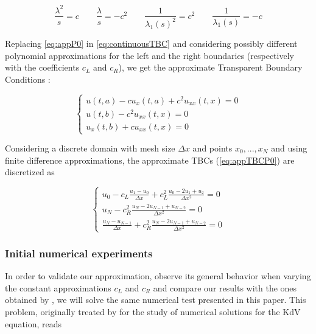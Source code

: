 \begin{equation}
	\label{eq:appP0}
	\frac{\lambda^2}{s}  = c \qquad
	\frac{\lambda}{s}  = -c^2 \qquad
	\frac{1}{\lambda_1(s)^2}  = c^2\qquad 
	 \frac{1}{\lambda_1(s)}  = -c 
\end{equation}

\indent Replacing \eqref{eq:appP0} in \eqref{eq:continuousTBC} and considering possibly different polynomial approximations for the left and the right boundaries (respectively with the coefficients $c_L$ and $c_R$), we get the approximate Transparent Boundary Conditions : 

\begin{equation}
\label{eq:appTBCP0}
    \begin{cases}
        u(t,a) - c u_x(t,a)  + c^2  u_{xx}(t,x) = 0 \\
        u(t,b) - c^2    u_{xx}(t,x) = 0 \\
        u_x(t,b) + c u_{xx}(t,x)= 0 
    \end{cases}
\end{equation}

\indent Considering a discrete domain with mesh size $\Delta x$ and points $x_0, ..., x_N$ and using finite difference approximations, the approximate TBCs (\ref{eq:appTBCP0}) are discretized as

\begin{equation}
\label{eq:appDiscTBCP0}
    \begin{cases}
        u_0 - c_L \frac{u_1 - u_0}{\Delta x}  + c_L^2  \frac{u_0 -2u_1 + u_2}{\Delta x^2} = 0 \\
        u_N - c_R^2    \frac{u_N -2u_{N-1} + u_{N-2}}{\Delta x^2} = 0 \\
        \frac{u_N - u_{N-1}}{\Delta x}  + c_R^2    \frac{u_N -2u_{N-1} + u_{N-2}}{\Delta x^2} = 0 
    \end{cases}
\end{equation}

\subsubsection{Initial numerical experiments}

\indent In order to validate our approximation, observe its general behavior when varying the constant approximations $c_L$ and $c_R$ and compare our results with the ones obtained by \cite{besse2015}, we will solve the same numerical test presented in this paper. This problem,  originally treated by \cite{zheng2008} for the study of numerical solutions for the KdV equation, reads

